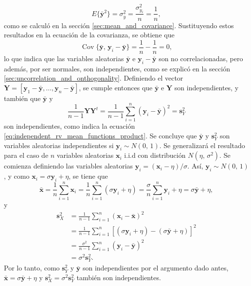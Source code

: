 \documentclass[a4paper]{report}
\newcommand{\Y}{\mathbf{Y}}
\newcommand{\x}{\mathbf{x}}
\newcommand{\y}{\mathbf{y}}
\begin{document}
\[
 E\{{\bar{\y}}^2\}=\sigma_{\bar{y}}^2=\frac{\sigma_{y_i}^2}{n}=\frac{1}{n},
\]
como se calculó en la sección \ref{sec:mean_and_covariance}. Sustituyendo estos resultados en la ecuación de la covarianza, se obtiene que
\[
 \operatorname{Cov}\{\bar{\y},\,\y_i-\bar{\y}\}=\frac{1}{n}-\frac{1}{n}=0,
\]
lo que indica que las variables aleatorias \(\bar{\y}\) e \(\y_i-\bar{\y}\) son no correlacionadas, pero además, por ser normales, son independientes, como se explicó en la sección \ref{sec:uncorrelation_and_onthogonality}. Definiendo el vector \(\Y=[\y_1-\bar{\y},\dots,\y_n-\bar{\y}]\), se cumple entonces que \(\bar{\y}\) e \(\Y\) son independientes, y también que \(\bar{\y}\) y
\[
 \frac{1}{n-1}\Y\Y^t=\frac{1}{n-1}\sum_{i=1}^{n}(\y_i-\bar{\y})^2=\mathbf{s}^2_Y
\]
son independientes, como indica la ecuación \ref{eq:independent_rv_mean_functions_product}. Se concluye que \(\bar{\y}\) y \(\mathbf{s}_Y^2\) son variables aleatorias independientes si \(\y_i\sim N(0,\,1)\). Se generalizará el resultado para el caso de \(n\) variables aleatorias \(\x_i\) i.i.d con distribución \(N(\eta,\,\sigma^2)\). Se comienza definiendo las variables aleatorias \(\y_i=(\x_i-\eta)/\sigma\). Así, \(\y_i\sim N(0,\,1)\), y como \(\x_i=\sigma \y_i+\eta\), se tiene que
\[
 \bar{\x}=\frac{1}{n}\sum_{i=1}^{n}\x_i=\frac{1}{n}\sum_{i=1}^{n}(\sigma \y_i+\eta)=\frac{\sigma}{n}\sum_{i=1}^{n}\y_i+\eta=\sigma\bar{\y}+\eta,
\]
y
\begin{align*}
 \mathbf{s}^2_X&=\frac{1}{n-1}\sum_{i=1}^{n}(\x_i-\bar{\x})^2\\
   &=\frac{1}{n-1}\sum_{i=1}^{n}\left[(\sigma \y_i+\eta)-(\sigma \bar{\y}+\eta)\right]^2\\
   &=\frac{\sigma^2}{n-1}\sum_{i=1}^{n}\left(\y_i-\bar{\y}\right)^2\\
   &=\sigma^2\mathbf{s}_Y^2.
\end{align*}
Por lo tanto, como \(\mathbf{s}_Y^2\) y \(\bar{\y}\) son independientes por el argumento dado antes, \(\bar{\x}=\sigma\bar{\y}+\eta\) y \(\mathbf{s}^2_X=\sigma^2\mathbf{s}_Y^2\) también son independientes.
\end{document}
